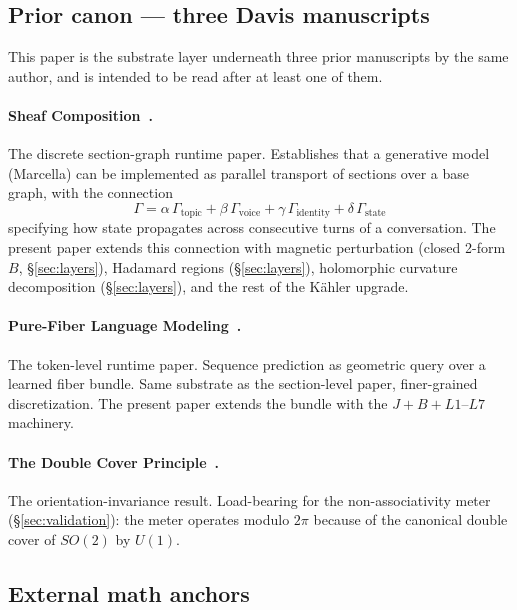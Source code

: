 \documentclass[11pt,letterpaper]{article}
\begin{document}
\subsection{Prior canon --- three Davis manuscripts}
\label{sec:prior-canon}

This paper is the substrate layer underneath three prior manuscripts
by the same author, and is intended to be read after at least one of
them.

\paragraph{Sheaf Composition~\cite{davis2026sheafcomposition}.}
The discrete section-graph runtime paper. Establishes that a
generative model (Marcella) can be implemented as parallel transport
of sections over a base graph, with the connection
\[
\Gamma = \alpha\,\Gamma_{\text{topic}} + \beta\,\Gamma_{\text{voice}}
       + \gamma\,\Gamma_{\text{identity}} + \delta\,\Gamma_{\text{state}}
\]
specifying how state propagates across consecutive turns of a
conversation. The present paper extends this connection with magnetic
perturbation (closed 2-form $B$, \S\ref{sec:layers}), Hadamard regions
(\S\ref{sec:layers}), holomorphic curvature decomposition
(\S\ref{sec:layers}), and the rest of the K\"ahler upgrade.

\paragraph{Pure-Fiber Language Modeling~\cite{davis2026purefiber}.}
The token-level runtime paper. Sequence prediction as geometric query
over a learned fiber bundle. Same substrate as the section-level
paper, finer-grained discretization. The present paper extends the
bundle with the $J + B + L1\text{--}L7$ machinery.

\paragraph{The Double Cover Principle~\cite{davis2026doublecover}.}
The orientation-invariance result. Load-bearing for the
non-associativity meter (\S\ref{sec:validation}): the meter operates
modulo $2\pi$ because of the canonical double cover of $SO(2)$ by
$U(1)$.

\subsection{External math anchors}
\end{document}
